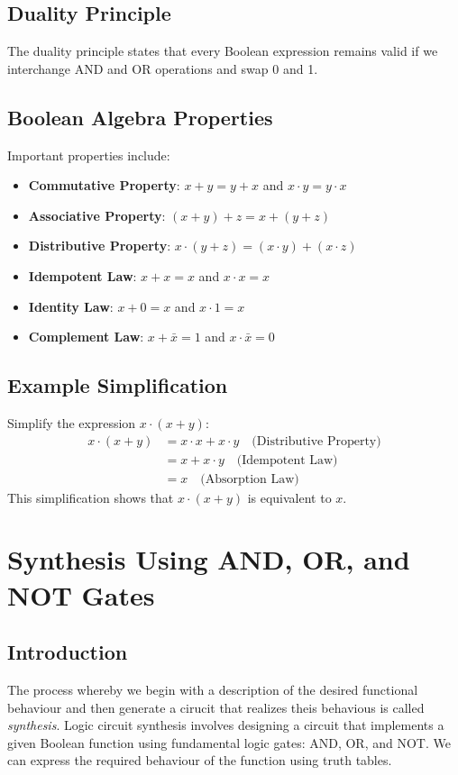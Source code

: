 \documentclass[twocolumn]{article}
\begin{document}
\subsection{Duality Principle}
The duality principle states that every Boolean expression remains valid if we interchange AND and OR operations and swap 0 and 1.

\subsection{Boolean Algebra Properties}
Important properties include:
\begin{itemize}
    \item \textbf{Commutative Property}: $x + y = y + x$ and $x \cdot y = y \cdot x$
    \item \textbf{Associative Property}: $(x + y) + z = x + (y + z)$
    \item \textbf{Distributive Property}: $x \cdot (y + z) = (x \cdot y) + (x \cdot z)$
    \item \textbf{Idempotent Law}: $x + x = x$ and $x \cdot x = x$
    \item \textbf{Identity Law}: $x + 0 = x$ and $x \cdot 1 = x$
    \item \textbf{Complement Law}: $x + \bar{x} = 1$ and $x \cdot \bar{x} = 0$
\end{itemize}

\subsection{Example Simplification}
Simplify the expression $x \cdot (x + y)$:
\begin{align*}
    x \cdot (x + y) &= x \cdot x + x \cdot y \quad \text{(Distributive Property)} \\
    &= x + x \cdot y \quad \text{(Idempotent Law)} \\
    &= x \quad \text{(Absorption Law)}
\end{align*}
This simplification shows that $x \cdot (x + y)$ is equivalent to $x$.

\section{Synthesis Using AND, OR, and NOT Gates}

\subsection{Introduction}
The process whereby we begin with a description of the desired functional behaviour and then generate a cirucit that realizes theis behavious is called \textit{synthesis}. Logic circuit synthesis involves designing a circuit that implements a given Boolean function using fundamental logic gates: AND, OR, and NOT. We can express the required behaviour of the function using truth tables. 
\end{document}

